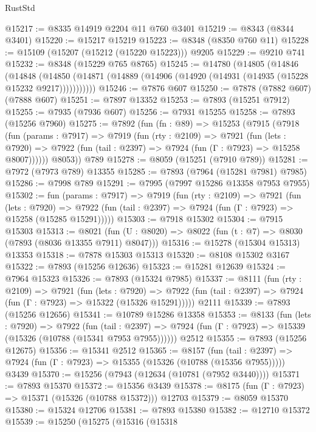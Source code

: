 \begin{lexlean}{RustStd}
\begin{coremodule}
{\begin{coremodule}
{{{{{{{{{{{{{{{{{{{{{{{{{{{{{{{{{{{{{{{{{{{{{{{{{{@15217 := @8335 @14919 @2204 @11 @760 @3401
@15219 := @8343 (@8344 @3401)
@15220 := @15217 @15219
@15223 := @8348 (@8350 @760 @11)
@15228 := @15109 (@15207 (@15212 (@15220 @15223))) @9205
@15229 := @9210 @741
@15232 := @8348 (@15229 @765 @8765)
@15245 := @14780
    (@14805
      (@14846
        (@14848
          (@14850 (@14871 (@14889 (@14906 (@14920 (@14931 (@14935 (@15228 @15232 @9217)))))))))))
@15246 := @7876 @607
@15250 := @7878 (@7882 @607) (@7888 @607)
@15251 := @7897 @13352
@15253 := @7893 (@15251 @7912)
@15255 := @7935 (@7936 @607)
@15256 := @7931 @15255
@15258 := @7893 (@15256 @7960)
@15275 := @7892
    (fun (fn : @89) =>
    @15253
      (@7915
        (@7918
          (fun (params : @7917) =>
          @7919
            (fun (rty : @2109) =>
            @7921
              (fun (lets : @7920) =>
              @7922 (fun (tail : @2397) => @7924 (fun (Γ : @7923) => @15258 @8007))))))
        @8053))
    @789
@15278 := @8059 (@15251 (@7910 @789))
@15281 := @7972 (@7973 @789) @13355
@15285 := @7893 (@7964 (@15281 @7981) @7985)
@15286 := @7998 @789
@15291 := @7995 (@7997 @15286 @13358 @7953 @7955)
@15302 := fun (params : @7917) =>
  @7919
    (fun (rty : @2109) =>
    @7921
      (fun (lets : @7920) =>
      @7922 (fun (tail : @2397) => @7924 (fun (Γ : @7923) => @15258 (@15285 @15291)))))
@15303 := @7918 @15302
@15304 := @7915 @15303
@15313 := @8021
    (fun (U : @8020) => @8022 (fun (t : @7) => @8030 (@7893 (@8036 @13355 @7911) @8047)))
@15316 := @15278 (@15304 @15313) @13353
@15318 := @7878 @15303 @15313
@15320 := @8108 @15302 @3167
@15322 := @7893 (@15256 @12636)
@15323 := @15281 @12639
@15324 := @7964 @15323
@15326 := @7893 (@15324 @7985)
@15337 := @8111
    (fun (rty : @2109) =>
    @7921
      (fun (lets : @7920) =>
      @7922 (fun (tail : @2397) => @7924 (fun (Γ : @7923) => @15322 (@15326 @15291)))))
    @2111
@15339 := @7893 (@15256 @12656)
@15341 := @10789 @15286 @13358
@15353 := @8133
    (fun (lets : @7920) =>
    @7922
      (fun (tail : @2397) =>
      @7924 (fun (Γ : @7923) => @15339 (@15326 (@10788 (@15341 @7953 @7955))))))
    @2512
@15355 := @7893 (@15256 @12675)
@15356 := @15341 @2512
@15365 := @8157
    (fun (tail : @2397) => @7924 (fun (Γ : @7923) => @15355 (@15326 (@10788 (@15356 @7955)))))
    @3439
@15370 := @15256 (@7943 (@12634 (@10781 (@7952 @3440))))
@15371 := @7893 @15370
@15372 := @15356 @3439
@15378 := @8175 (fun (Γ : @7923) => @15371 (@15326 (@10788 @15372))) @12703
@15379 := @8059 @15370
@15380 := @15324 @12706
@15381 := @7893 @15380
@15382 := @12710 @15372
@15539 := @15250
    (@15275
      (@15316
        (@15318
}}}}}}}}}}}}}}}}}}}}}}}}}}}}}}}}}}}}}}}}}}}}}}}}}}
\end{coremodule}}
\end{coremodule}
\end{lexlean}
